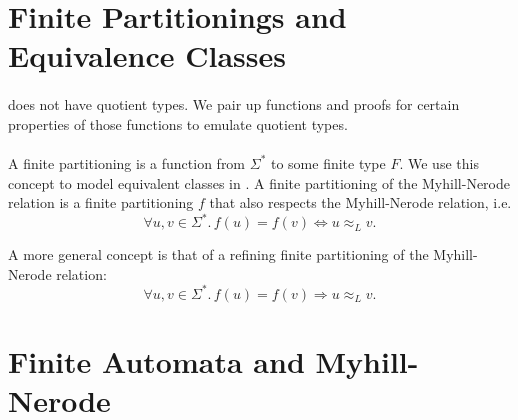 \documentclass[11pt,a4paper,oneside]{book}
\begin{document}
            \section{Finite Partitionings and Equivalence Classes}

                \paragraph{}
                    \coq does not have quotient types. 
                    We pair up functions and proofs for certain properties of those functions to emulate quotient types.

                \paragraph{} 
                    A finite partitioning is a function from $\Sigma^*$ to some finite type $F$. 
                    We use this concept to model equivalent classes in \coq. 
                    A finite partitioning of the Myhill-Nerode relation is a finite partitioning $f$ that also respects the Myhill-Nerode relation, i.e. 
                    \[
                        \forall u, v \in \Sigma^*. \,
                        f(u) = f(v) \Leftrightarrow u \approx_L v.
                    \]
                    


                    A more general concept is that of a refining finite partitioning of the Myhill-Nerode relation:
                    \[
                        \forall u, v \in \Sigma^*. \,
                        f(u) = f(v) \Rightarrow u \approx_L v.
                    \]







        \section{Finite Automata and Myhill-Nerode}

            \paragraph{}
\end{document}
